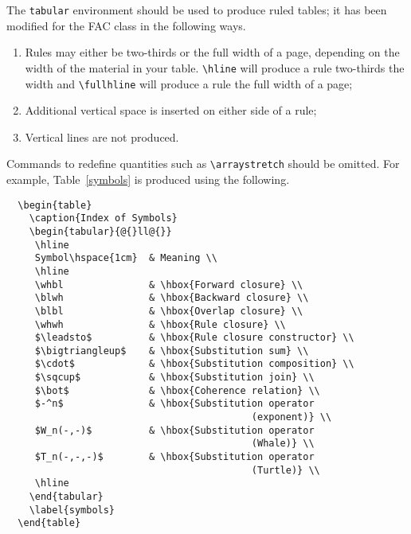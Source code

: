 \documentclass{fac}
\newcommand\black{\ensuremath{\blacktriangleright}}
\newcommand\white{\ensuremath{\vartriangleright}}
\newcommand\whbl{\white\kern-.1em--\kern-.1em\black}
\newcommand\blwh{\black\kern-.1em--\kern-.1em\white}
\newcommand\blbl{\black\kern-.1em--\kern-.1em\black}
\newcommand\whwh{\white\kern-.1em--\kern-.1em\white}
\newcommand\whbl{\white\kern-.125em--\kern-.125em\black}%
\newcommand\blwh{\black\kern-.125em--\kern-.125em\white}%
\newcommand\blbl{\black\kern-.125em--\kern-.125em\black}%
\newcommand\whwh{\white\kern-.125em--\kern-.125em\white}}
\begin{document}
The \verb"tabular" environment should be used to produce ruled tables;
it has been modified for the FAC class in the following ways.
%
\begin{enumerate}
  \item Rules may either be two-thirds or the full width of a page, 
depending on the width of the material in your table. \verb"\hline" 
will produce a rule two-thirds the width and \verb"\fullhline" will 
produce a rule the full width of a page;
  \item Additional vertical space is inserted on either side of a rule;
  \item Vertical lines are not produced.
\end{enumerate}
%
Commands to redefine quantities such as \verb"\arraystretch" should be
omitted. For example, Table~\ref{symbols} is produced using the following.
%
\begin{verbatim}
  \begin{table}
    \caption{Index of Symbols}
    \begin{tabular}{@{}ll@{}}
     \hline
     Symbol\hspace{1cm}  & Meaning \\
     \hline
     \whbl               & \hbox{Forward closure} \\
     \blwh               & \hbox{Backward closure} \\
     \blbl               & \hbox{Overlap closure} \\
     \whwh               & \hbox{Rule closure} \\
     $\leadsto$          & \hbox{Rule closure constructor} \\
     $\bigtriangleup$    & \hbox{Substitution sum} \\
     $\cdot$             & \hbox{Substitution composition} \\
     $\sqcup$            & \hbox{Substitution join} \\
     $\bot$              & \hbox{Coherence relation} \\
     $-^n$               & \hbox{Substitution operator 
                                           (exponent)} \\
     $W_n(-,-)$          & \hbox{Substitution operator 
                                           (Whale)} \\
     $T_n(-,-,-)$        & \hbox{Substitution operator 
                                           (Turtle)} \\
     \hline
    \end{tabular}
    \label{symbols}
  \end{table}
\end{verbatim}
\end{document}
